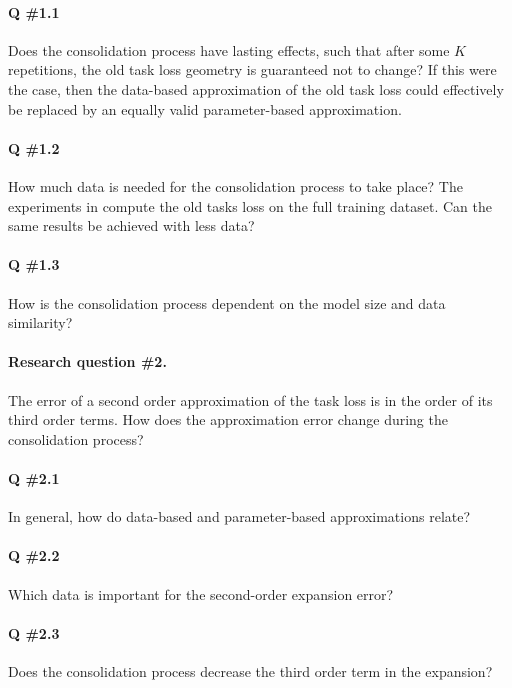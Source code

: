 \documentclass{article} %
\begin{document}
\paragraph{Q \#1.1} Does the consolidation process have lasting effects, such that after some $K$ repetitions, the old task loss geometry is guaranteed not to change? If this were the case, then the data-based approximation of the old task loss could effectively be replaced by an equally valid parameter-based approximation. 

\paragraph{Q \#1.2} How much data is needed for the consolidation process to take place? The experiments in  \citet{mirzadeh_linear_2020-1} compute the old tasks loss on the full training dataset. Can the same results be achieved with less data? 

\paragraph{Q \#1.3} How is the consolidation process dependent on the model size and data similarity? 


\paragraph{Research question \#2.} The error of a second order approximation of the task loss is in the order of its third order terms. How does the approximation error change during the consolidation process? 

\paragraph{Q \#2.1} In general, how do data-based and parameter-based approximations relate? 

\paragraph{Q \#2.2} Which data is important for the second-order expansion error? 

\paragraph{Q \#2.3} Does the consolidation process decrease the third order term in the expansion? 


\newpage
\end{document}
